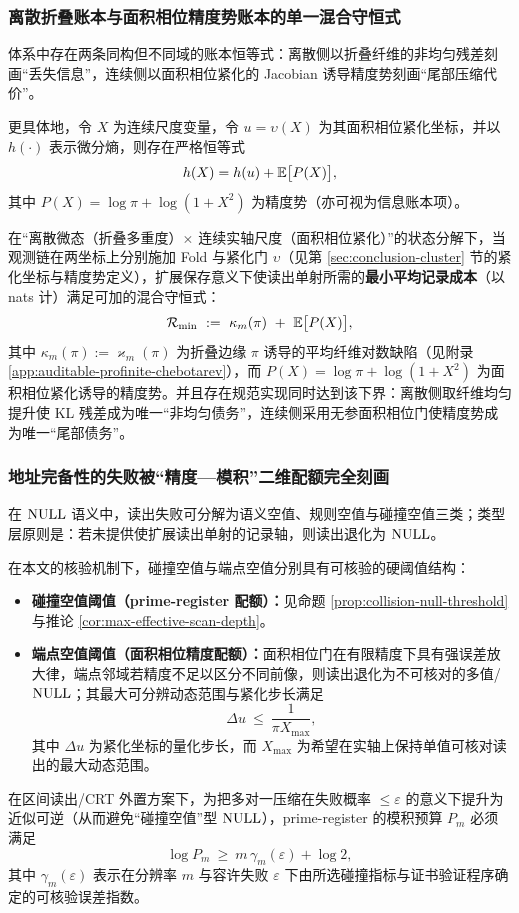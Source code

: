 \subsubsection{离散折叠账本与面积相位精度势账本的单一混合守恒式}\label{subsubsec:app28-mixed-ledger}
体系中存在两条同构但不同域的账本恒等式：离散侧以折叠纤维的非均匀残差刻画“丢失信息”，连续侧以面积相位紧化的 Jacobian 诱导精度势刻画“尾部压缩代价”。
\par
更具体地，令 $X$ 为连续尺度变量，令 $u=\upsilon(X)$ 为其面积相位紧化坐标，并以 $h(\cdot)$ 表示微分熵，则存在严格恒等式
$$
h(X)=h(u)+\mathbb{E}\bigl[P(X)\bigr],
$$
其中 $P(X)=\log\pi+\log(1+X^2)$ 为精度势（亦可视为信息账本项）。
\par
在“离散微态（折叠多重度）$\times$ 连续实轴尺度（面积相位紧化）”的状态分解下，当观测链在两坐标上分别施加 Fold 与紧化门 $\upsilon$（见第 \ref{sec:conclusion-cluster} 节的紧化坐标与精度势定义），扩展保存意义下使读出单射所需的\textbf{最小平均记录成本}（以 nats 计）满足可加的混合守恒式：
$$
\mathcal{R}_{\min}\ :=\ \kappa_m(\pi)\ +\ \EE\bigl[P(X)\bigr],
$$
其中 $\kappa_m(\pi):=\varkappa_m(\pi)$ 为折叠边缘 $\pi$ 诱导的平均纤维对数缺陷（见附录 \ref{app:auditable-profinite-chebotarev}），而 $P(X)=\log\pi+\log(1+X^2)$ 为面积相位紧化诱导的精度势。并且存在规范实现同时达到该下界：离散侧取纤维均匀提升使 KL 残差成为唯一“非均匀债务”，连续侧采用无参面积相位门使精度势成为唯一“尾部债务”。

\subsubsection{地址完备性的失败被“精度—模积”二维配额完全刻画}\label{subsubsec:app28-resource-phase}
在 $\mathrm{NULL}$ 语义中，读出失败可分解为语义空值、规则空值与碰撞空值三类；类型层原则是：若未提供使扩展读出单射的记录轴，则读出退化为 $\mathrm{NULL}$。
\par
在本文的核验机制下，碰撞空值与端点空值分别具有可核验的硬阈值结构：
\begin{itemize}
  \item \textbf{碰撞空值阈值（prime-register 配额）：}见命题 \ref{prop:collision-null-threshold} 与推论 \ref{cor:max-effective-scan-depth}。
  \item \textbf{端点空值阈值（面积相位精度配额）：}面积相位门在有限精度下具有强误差放大律，端点邻域若精度不足以区分不同前像，则读出退化为不可核对的多值/$\mathrm{NULL}$；其最大可分辨动态范围与紧化步长满足
  $$
  \Delta u\ \le\ \frac{1}{\pi X_{\max}},
  $$
  其中 $\Delta u$ 为紧化坐标的量化步长，而 $X_{\max}$ 为希望在实轴上保持单值可核对读出的最大动态范围。
\end{itemize}
\begin{proposition}\label{prop:collision-null-threshold}
在区间读出/CRT 外置方案下，为把多对一压缩在失败概率 $\le\varepsilon$ 的意义下提升为近似可逆（从而避免“碰撞空值”型 $\mathrm{NULL}$），prime-register 的模积预算 $P_m$ 必须满足
$$
\log P_m\ \ge\ m\,\gamma_m(\varepsilon)+\log 2,
$$
其中 $\gamma_m(\varepsilon)$ 表示在分辨率 $m$ 与容许失败 $\varepsilon$ 下由所选碰撞指标与证书验证程序确定的可核验误差指数。
\end{proposition}


